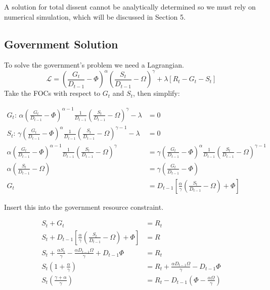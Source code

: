 \documentclass[12pt]{article}
\begin{document}
\begin{spacing}{1.5}
A solution for total dissent cannot be analytically determined so we must rely on numerical simulation, which will be discussed in Section 5. 

\subsection{Government Solution}

To solve the government's problem we need a Lagrangian.
\begin{equation}
\mathcal{L} = \left(\frac{G_t}{ D_{t-1}}-\Phi\right)^\alpha \left(\frac{S_t}{ D_{t-1}}-\Omega\right)^\gamma  +\lambda[R_t-G_t-S_t] 
\end{equation}
Take the FOCs with respect to $G_t$ and $S_t$, then simplify:

\begin{equation}
    \begin{aligned}
        G_t\text{: } \alpha \left(\frac{G_t}{ D_{t-1}}-\Phi\right)^{\alpha-1} \frac{1}{ D_{t-1}} \left(\frac{S_t}{D_{t-1}}-\Omega\right)^\gamma  -\lambda &=0  \\
S_t\text{: } \gamma  \left(\frac{G_t}{ D_{t-1}}-\Phi\right)^{\alpha} \frac{1}{D_{t-1}} \left(\frac{S_t}{D_{t-1}}-\Omega\right)^{\gamma -1} -\lambda &=0 \\
\alpha \left(\frac{G_t}{D_{t-1}}-\Phi\right)^{\alpha-1} \frac{1}{ D_{t-1}} \left(\frac{S_t}{D_{t-1}}-\Omega\right)^\gamma  &= \gamma  \left(\frac{G_t}{ D_{t-1}}-\Phi\right)^{\alpha} \frac{1}{ D_{t-1}} \left(\frac{S_t}{ D_{t-1}}-\Omega\right)^{\gamma -1} \\
\alpha \left(\frac{S_t}{ D_{t-1}}-\Omega \right) &= \gamma  \left( \frac{G_t}{ D_{t-1}}-\Phi \right) \\
G_t&= D_{t-1}\left[\frac{\alpha}{\gamma } \left(\frac{S_t}{ D_{t-1}} -\Omega \right)+\Phi \right]
    \end{aligned}
\end{equation}

\noindent Insert this into the government resource constraint. 

\begin{equation}
    \begin{aligned}
        S_t+G_t&=R_t \\
        S_t+  D_{t-1}\left[\frac{\alpha}{\gamma } \left(\frac{S_t}{ D_{t-1}} -\Omega \right) +\Phi \right]  &= R \\
S_t+ \frac{\alpha S_t}{\gamma } -\frac{\alpha  D_{t-1} \Omega}{\gamma } +D_{t-1}\Phi &=R_t \\
S_t\left(1+\frac{\alpha}{\gamma }\right) &= R_t+ \frac{\alpha D_{t-1} \Omega}{\gamma } - D_{t-1}\Phi \\
S_t\left(\frac{\gamma  + \alpha}{\gamma }\right) &= R_t - D_{t-1} \left(\Phi - \frac{\alpha  \Omega}{\gamma } \right) 
    \end{aligned}
\end{equation}


\end{spacing}
\end{document}
